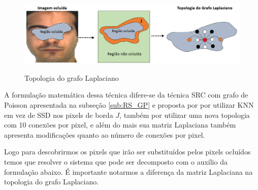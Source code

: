 \begin{figure}[H]
\centering
\caption{Topologia do grafo Laplaciano}
\includegraphics[scale=0.45]{imgs/regiao2.png}
\label{fig:topologia_grafo}
\end{figure}

A formulação matemática dessa técnica difere-se da técnica SRC com grafo de Poisson apresentada na subseção \ref{sub:RS_GP} e proposta por  por utilizar KNN em vez de SSD nos pixels de borda $J$, também por utilizar uma nova topologia com 10 conexões por pixel, e além do mais sua matriz Laplaciana também apresenta modificações quanto ao número de conexões por pixel.

Logo para descobrirmos os pixels que irão ser substituídos pelos pixels ocluídos temos que resolver o sistema que pode ser decomposto com o auxílio da formulação abaixo. É importante notarmos a diferença da matriz Laplaciana na topologia do grafo Laplaciano.

